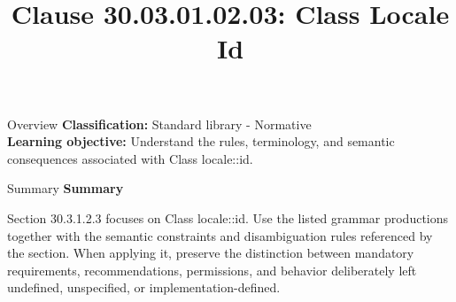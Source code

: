 \documentclass[10pt,letterpaper]{article}
\title{Clause 30.03.01.02.03: Class Locale Id}
\author{}
\date{}
\begin{document}
\maketitle
\begin{CornellOverviewBox}{Overview}
\textbf{Classification:} Standard library - Normative\\[2pt]
\textbf{Learning objective:} Understand the rules, terminology, and semantic consequences associated with Class locale::id.
\end{CornellOverviewBox}\begin{CornellSummaryBox}{Summary}
{\sffamily\bfseries\color{Accent} Summary}\par\vspace{3pt}Section 30.3.1.2.3 focuses on Class locale::id. Use the listed grammar productions together with the semantic constraints and disambiguation rules referenced by the section. When applying it, preserve the distinction between mandatory requirements, recommendations, permissions, and behavior deliberately left undefined, unspecified, or implementation-defined.
\end{CornellSummaryBox}
\end{document}
